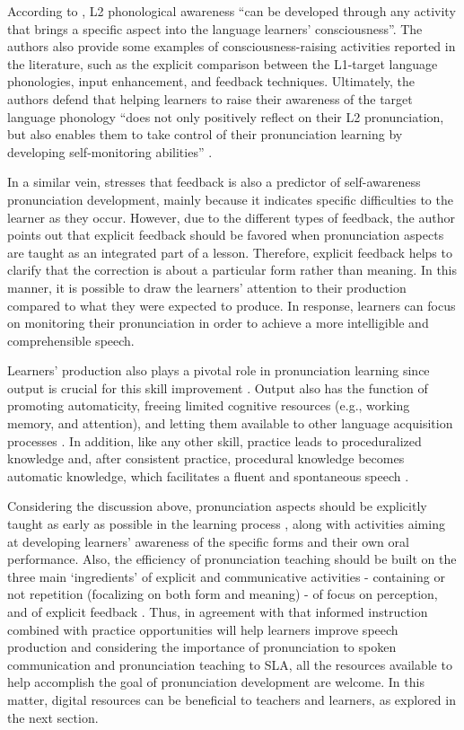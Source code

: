 \documentclass[english]{textolivre}
\begin{document}
According to \textcite[p. 104]{carlet_improving_2018}, L2 phonological awareness “can be developed through any activity that brings a specific aspect into the language learners’ consciousness”. The authors also provide some examples of consciousness-raising activities reported in the literature, such as the explicit comparison between the L1-target language phonologies, input enhancement, and feedback techniques. Ultimately, the authors defend that helping learners to raise their awareness of the target language phonology “does not only positively reflect on their L2 pronunciation, but also enables them to take control of their pronunciation learning by developing self-monitoring abilities” \cite[p. 104]{carlet_improving_2018}.

In a similar vein, \textcite{darcy2018} stresses that feedback is also a predictor of self-awareness pronunciation development, mainly because it indicates specific difficulties to the learner as they occur. However, due to the different types of feedback, the author points out that explicit feedback should be favored when pronunciation aspects are taught as an integrated part of a lesson. Therefore, explicit feedback helps to clarify that the correction is about a particular form rather than meaning. In this manner, it is possible to draw the learners’ attention to their production compared to what they were expected to produce. In response, learners can focus on monitoring their pronunciation in order to achieve a more intelligible and comprehensible speech.

Learners’ production also plays a pivotal role in pronunciation learning since output is crucial for this skill improvement \cite{demenko2010}. Output also has the function of promoting automaticity, freeing limited cognitive resources (e.g., working memory, and attention), and letting them available to other language acquisition processes \cite{grass2015, ortega2009}. In addition, like any other skill, practice leads to proceduralized knowledge and, after consistent practice, procedural knowledge becomes automatic knowledge, which facilitates a fluent and spontaneous speech \cite{dekeyser2015}.

Considering the discussion above, pronunciation aspects should be explicitly taught as early as possible in the learning process \cite{darcy2018, derwing2018}, along with activities aiming at developing learners’ awareness of the specific forms and their own oral performance. Also, the efficiency of pronunciation teaching should be built on the three main ‘ingredients’ of explicit and communicative activities - containing or not repetition (focalizing on both form and meaning) - of focus on perception, and of explicit feedback \cite{darcy2018}. Thus, in agreement with \textcite{thomson2015} that informed instruction combined with practice opportunities will help learners improve speech production and considering the importance of pronunciation to spoken communication and pronunciation teaching to SLA, all the resources available to help accomplish the goal of pronunciation development are welcome. In this matter, digital resources can be beneficial to teachers and learners, as explored in the next section.
\end{document}
